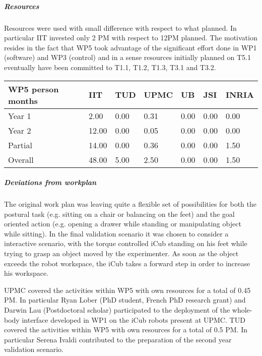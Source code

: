 
\subparagraph{Resources}

Resources were used with small difference with respect to what planned. In particular IIT invested only 2 PM with respect to 12PM planned. The motivation resides in the fact that WP5 took advantage of the significant effort done in WP1 (software) and WP3 (control) and in a sense resources initially planned on T5.1 eventually have been committed to T1.1, T1.2, T1.3, T3.1 and T3.2.

\begin{center}
\begin{tabular}{|C{1.5cm}|C{1.5cm}|C{1.5cm}|C{2cm}|C{2cm}|C{2cm}|C{2cm}|}
\hline
\footnotesize \textbf{WP5 person months}& \footnotesize \textbf{IIT}&\footnotesize \textbf{TUD}&\footnotesize \textbf{UPMC}& \footnotesize \textbf{UB} &\footnotesize \textbf{JSI} & \footnotesize \textbf{INRIA} \\ \hline
\footnotesize Year 1 &  2.00 & 0.00 & 0.31 & 0.00 & 0.00 & 0.00     \\  \hline
\footnotesize Year 2 &  12.00 & 0.00 & 0.05 & 0.00 & 0.00 & 0.00     \\  \hline
\footnotesize Partial &  14.00 & 0.00 & 0.36 & 0.00 & 0.00 & 1.50 \\ \hline \hline
\footnotesize Overall &  48.00 & 5.00 & 2.50 & 0.00 & 0.00 & 1.50 \\ \hline
\end{tabular}
\end{center}

\subparagraph{Deviations from workplan} 
The original work plan was leaving quite a flexible set of possibilities for both the postural task (e.g. sitting on a chair or balancing on the feet) and the goal oriented action (e.g. opening a drawer while standing or manipulating object while sitting). In the final validation scenario it was chosen to consider a interactive scenario, with the torque controlled iCub standing on his feet while trying to grasp an object moved by the experimenter. As soon as the object exceeds the robot workspace, the iCub takes a forward step in order to increase his workspace. 

UPMC covered the activities within WP5 with own resources for a total of 0.45 PM. In particular Ryan Lober (PhD student, French PhD research grant) and Darwin Lau (Postdoctoral scholar) participated to the deployment of the whole-body interface developed in WP1 on the iCub robots present at UPMC. TUD covered the activities within WP5 with own resources for a total of 0.5 PM. In particular Serena Ivaldi contributed to the preparation of the second year validation scenario.
